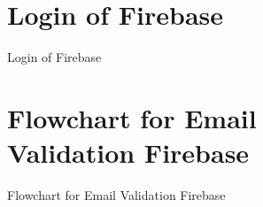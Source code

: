 \begin{figure}[h]
\section{Login of Firebase} 
  \centering
  \caption{Login of Firebase}
  
\end{figure}
\begin{figure}[h]
\section{Flowchart for Email Validation Firebase } 
  \centering
  \caption{Flowchart for Email Validation Firebase}
  
\end{figure}
